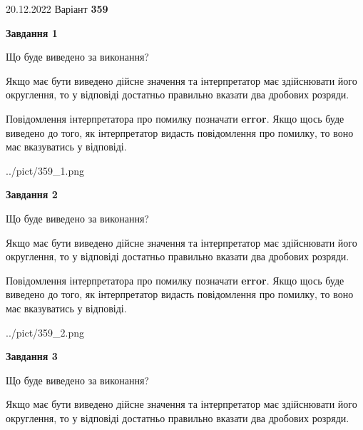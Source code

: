 \documentclass[12pt, ukrainian]{article}
\begin{document}
{20.12.2022 Варіант \No \textbf { 359 }\par}
{
\begin {Large}

{\begin {center}\textbf{Завдання 1}\end {center}}\par
Що буде виведено за виконання? \par

Якщо має бути виведено дійсне значення та інтерпретатор має здійснювати його округлення, 
то у відповіді достатньо правильно вказати два дробових розряди.

Повідомлення інтерпретатора про помилку позначати \textbf{error}.
Якщо щось буде виведено до того, як інтерпретатор видасть повідомлення про помилку, 
то воно має вказуватись у відповіді. \par

\begin{center}
	{../pict/359_1.png}
\end{center}
\newpage

{\begin {center}\textbf{Завдання 2}\end {center}}\par
Що буде виведено за виконання? \par

Якщо має бути виведено дійсне значення та інтерпретатор має здійснювати його округлення, 
то у відповіді достатньо правильно вказати два дробових розряди.

Повідомлення інтерпретатора про помилку позначати \textbf{error}.
Якщо щось буде виведено до того, як інтерпретатор видасть повідомлення про помилку, 
то воно має вказуватись у відповіді. \par

\begin{center}
	{../pict/359_2.png}
\end{center}
\newpage

{\begin {center}\textbf{Завдання 3}\end {center}}\par
Що буде виведено за виконання? \par

Якщо має бути виведено дійсне значення та інтерпретатор має здійснювати його округлення, 
то у відповіді достатньо правильно вказати два дробових розряди.


\end{Large}}
\end{document}
